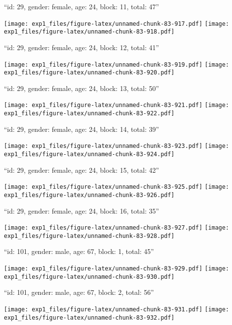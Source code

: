 \documentclass[11pt,,]{article}
\begin{document}
\newpage
[1] 

``id: 29, gender: female, age: 24, block: 11, total: 47''

\texttt{[image: exp1\_files/figure-latex/unnamed-chunk-83-917.pdf]}
\texttt{[image: exp1\_files/figure-latex/unnamed-chunk-83-918.pdf]}

\newpage
[1] 

``id: 29, gender: female, age: 24, block: 12, total: 41''

\texttt{[image: exp1\_files/figure-latex/unnamed-chunk-83-919.pdf]}
\texttt{[image: exp1\_files/figure-latex/unnamed-chunk-83-920.pdf]}

\newpage
[1] 

``id: 29, gender: female, age: 24, block: 13, total: 50''

\texttt{[image: exp1\_files/figure-latex/unnamed-chunk-83-921.pdf]}
\texttt{[image: exp1\_files/figure-latex/unnamed-chunk-83-922.pdf]}

\newpage
[1] 

``id: 29, gender: female, age: 24, block: 14, total: 39''

\texttt{[image: exp1\_files/figure-latex/unnamed-chunk-83-923.pdf]}
\texttt{[image: exp1\_files/figure-latex/unnamed-chunk-83-924.pdf]}

\newpage
[1] 

``id: 29, gender: female, age: 24, block: 15, total: 42''

\texttt{[image: exp1\_files/figure-latex/unnamed-chunk-83-925.pdf]}
\texttt{[image: exp1\_files/figure-latex/unnamed-chunk-83-926.pdf]}

\newpage
[1] 

``id: 29, gender: female, age: 24, block: 16, total: 35''

\texttt{[image: exp1\_files/figure-latex/unnamed-chunk-83-927.pdf]}
\texttt{[image: exp1\_files/figure-latex/unnamed-chunk-83-928.pdf]}

\newpage
[1] 

``id: 101, gender: male, age: 67, block: 1, total: 45''

\texttt{[image: exp1\_files/figure-latex/unnamed-chunk-83-929.pdf]}
\texttt{[image: exp1\_files/figure-latex/unnamed-chunk-83-930.pdf]}

\newpage
[1] 

``id: 101, gender: male, age: 67, block: 2, total: 56''

\texttt{[image: exp1\_files/figure-latex/unnamed-chunk-83-931.pdf]}
\texttt{[image: exp1\_files/figure-latex/unnamed-chunk-83-932.pdf]}
\end{document}
